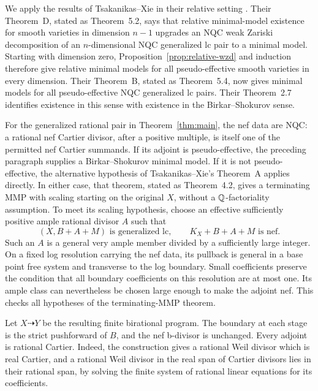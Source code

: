 We apply the results of Tsakanikas--Xie in their relative setting
\cite{TsakanikasXie}.  Their Theorem~D, stated as Theorem~5.2, says that
relative minimal-model existence for smooth varieties in dimension
$n-1$ upgrades an NQC weak Zariski decomposition of an $n$-dimensional
NQC generalized lc pair to a minimal model.  Starting with dimension
zero, Proposition~\ref{prop:relative-wzd} and induction therefore give
relative minimal models for all pseudo-effective smooth varieties in
every dimension.  Their Theorem~B, stated as Theorem~5.4, now gives
minimal models for all pseudo-effective NQC generalized lc pairs.
Their Theorem~2.7 identifies existence in this sense with existence in
the Birkar--Shokurov sense.

For the generalized rational pair in Theorem~\ref{thm:main}, the nef data
are NQC: a rational nef Cartier divisor, after a positive multiple, is
itself one of the permitted nef Cartier summands.  If its adjoint is
pseudo-effective, the preceding paragraph supplies a Birkar--Shokurov
minimal model.  If it is not pseudo-effective, the alternative hypothesis
of Tsakanikas--Xie's Theorem~A applies directly.  In either case, that
theorem, stated as Theorem~4.2, gives a terminating MMP with scaling
starting on the original $X$, without a $\mathbb Q$-factoriality assumption.
To meet its scaling hypothesis, choose an effective sufficiently positive
ample rational divisor $A$ such that
\[
 (X,B+A+M)\text{ is generalized lc},
 \qquad K_X+B+A+M\text{ is nef}.
\]
Such an $A$ is a general very ample member divided by a sufficiently
large integer.  On a fixed log resolution carrying the nef data, its
pullback is general in a base point free system and transverse to the
log boundary.  Small coefficients preserve the condition that all
boundary coefficients on this resolution are at most one.  Its ample
class can nevertheless be chosen large enough to make the adjoint nef.
This checks all hypotheses of the terminating-MMP theorem.

Let $X\dashrightarrow Y$ be the resulting finite birational program.
The boundary at each stage is the strict pushforward of $B$, and the nef
b-divisor is unchanged.  Every adjoint is rational Cartier.  Indeed, the
construction gives a rational Weil divisor which is real Cartier, and a
rational Weil divisor in the real span of Cartier divisors lies in their
rational span, by solving the finite system of rational linear equations
for its coefficients.

